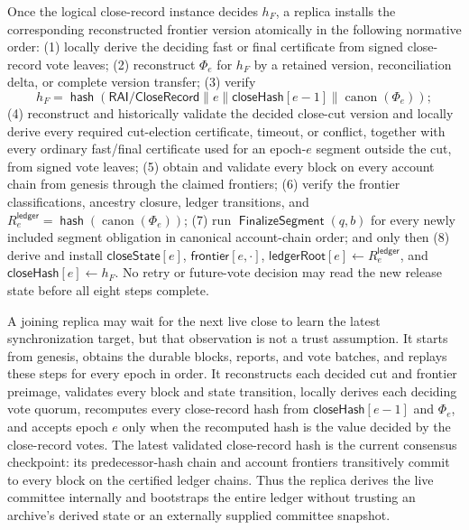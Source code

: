 \documentclass[sigplan,twocolumn,review,anonymous]{acmart}
\newcommand{\func}[1]{\operatorname{\mathsf{#1}}}
\newcommand{\hash}{\func{hash}}
\newcommand{\frontier}{\mathsf{frontier}}
\newcommand{\ledgerRoot}{\mathsf{ledgerRoot}}
\newcommand{\closeHash}{\mathsf{closeHash}}
\newcommand{\FinalizeSegment}{\func{FinalizeSegment}}
\newcommand{\closeState}{\mathsf{closeState}}
\begin{document}
Once the logical close-record instance decides \(h_F\), a replica installs the corresponding
reconstructed frontier version atomically in the following normative order: (1) locally derive the
deciding fast or final certificate from signed close-record vote leaves; (2) reconstruct \(\Phi_e\) for \(h_F\) by a
retained version, reconciliation delta, or complete version transfer; (3) verify
\[
h_F=\hash(\mathsf{RAI/CloseRecord}\parallel e\parallel\closeHash[e-1]
\parallel\operatorname{canon}(\Phi_e));
\]
(4) reconstruct and historically validate the decided close-cut version and locally derive every required
cut-election certificate, timeout, or conflict, together with every ordinary fast/final certificate used
for an epoch-\(e\) segment outside the cut, from signed vote leaves; (5) obtain and validate every block on every account
chain from genesis through the claimed frontiers; (6) verify the frontier classifications, ancestry
closure, ledger transitions, and \(R^{\mathsf{ledger}}_e=\hash(\operatorname{canon}(\Phi_e))\); (7)
run \(\FinalizeSegment(q,b)\) for every newly included segment obligation in canonical account-chain order; and only then (8)
derive and install \(\closeState[e]\), \(\frontier[e,\cdot]\),
\(\ledgerRoot[e]\gets R^{\mathsf{ledger}}_e\), and \(\closeHash[e]\gets h_F\).  No retry or
future-vote decision may read the new release state before all eight steps complete.

A joining replica may wait for the next live close to learn the latest synchronization target, but that
observation is not a trust assumption.  It starts from genesis, obtains the durable blocks, reports, and
vote batches, and replays these steps for every epoch in order.  It reconstructs each decided cut and frontier
preimage, validates every block and state transition, locally derives each deciding vote quorum,
recomputes every close-record hash from \(\closeHash[e-1]\) and \(\Phi_e\), and accepts epoch \(e\)
only when the recomputed hash is the value decided by the close-record votes.  The latest validated
close-record hash is the current consensus checkpoint: its predecessor-hash chain and account
frontiers transitively commit to every block on the certified ledger chains.  Thus the replica derives
the live committee internally and bootstraps the entire ledger without trusting an archive's derived
state or an externally supplied committee snapshot.
\end{document}
